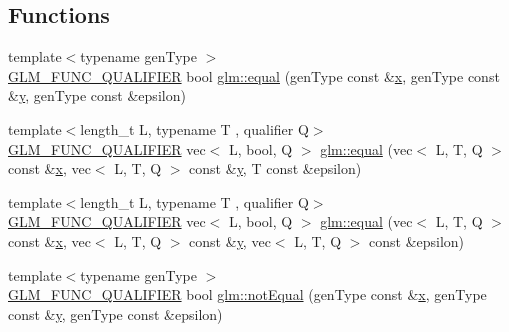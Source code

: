 \subsection*{Functions}
\begin{DoxyCompactItemize}
\item 
{\footnotesize template$<$typename gen\+Type $>$ }\\\hyperlink{setup_8hpp_a33fdea6f91c5f834105f7415e2a64407}{G\+L\+M\+\_\+\+F\+U\+N\+C\+\_\+\+Q\+U\+A\+L\+I\+F\+I\+ER} bool \hyperlink{group__ext__vector__relational_gac4ae021e79693174e4de6560d159b33a}{glm\+::equal} (gen\+Type const \&\hyperlink{_s_d_l__opengl_8h_ad0e63d0edcdbd3d79554076bf309fd47}{x}, gen\+Type const \&\hyperlink{_s_d_l__opengl_8h_a1675d9d7bb68e1657ff028643b4037e3}{y}, gen\+Type const \&epsilon)
\item 
{\footnotesize template$<$length\+\_\+t L, typename T , qualifier Q$>$ }\\\hyperlink{setup_8hpp_a33fdea6f91c5f834105f7415e2a64407}{G\+L\+M\+\_\+\+F\+U\+N\+C\+\_\+\+Q\+U\+A\+L\+I\+F\+I\+ER} vec$<$ L, bool, Q $>$ \hyperlink{group__ext__vector__relational_gae630b1f87fbd3b762ca46b0b8b32b02e}{glm\+::equal} (vec$<$ L, T, Q $>$ const \&\hyperlink{_s_d_l__opengl_8h_ad0e63d0edcdbd3d79554076bf309fd47}{x}, vec$<$ L, T, Q $>$ const \&\hyperlink{_s_d_l__opengl_8h_a1675d9d7bb68e1657ff028643b4037e3}{y}, T const \&epsilon)
\item 
{\footnotesize template$<$length\+\_\+t L, typename T , qualifier Q$>$ }\\\hyperlink{setup_8hpp_a33fdea6f91c5f834105f7415e2a64407}{G\+L\+M\+\_\+\+F\+U\+N\+C\+\_\+\+Q\+U\+A\+L\+I\+F\+I\+ER} vec$<$ L, bool, Q $>$ \hyperlink{group__ext__vector__relational_ga6fb2432528edd028e3c2cf5b78d99797}{glm\+::equal} (vec$<$ L, T, Q $>$ const \&\hyperlink{_s_d_l__opengl_8h_ad0e63d0edcdbd3d79554076bf309fd47}{x}, vec$<$ L, T, Q $>$ const \&\hyperlink{_s_d_l__opengl_8h_a1675d9d7bb68e1657ff028643b4037e3}{y}, vec$<$ L, T, Q $>$ const \&epsilon)
\item 
{\footnotesize template$<$typename gen\+Type $>$ }\\\hyperlink{setup_8hpp_a33fdea6f91c5f834105f7415e2a64407}{G\+L\+M\+\_\+\+F\+U\+N\+C\+\_\+\+Q\+U\+A\+L\+I\+F\+I\+ER} bool \hyperlink{group__ext__vector__relational_ga27c5118811bcfed5504e50f22693373e}{glm\+::not\+Equal} (gen\+Type const \&\hyperlink{_s_d_l__opengl_8h_ad0e63d0edcdbd3d79554076bf309fd47}{x}, gen\+Type const \&\hyperlink{_s_d_l__opengl_8h_a1675d9d7bb68e1657ff028643b4037e3}{y}, gen\+Type const \&epsilon)
\item 

\end{DoxyCompactItemize}
